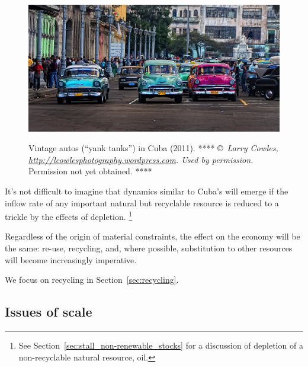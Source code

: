 \begin{figure}[!ht]
\centering\
\includegraphics[width=\linewidth]{Part_0/Chapter_Acct_For_WoN/images/old-cars-of-cuba-dsc_4474-1024.jpg}
\caption[Vintage autos in Cuba]{Vintage autos (``yank tanks'') in Cuba (2011).
**** \copyright~\emph{Larry Cowles, {\scriptsize \emph{\url{http://lcowlesphotography.wordpress.com}}}. Used by permission.} 
Permission not yet obtained. ****}
\label{fig:vintage_autos_cuba}
\end{figure}

It's not difficult to imagine that dynamics similar to Cuba's will emerge
if the inflow rate 
of any important natural but recyclable resource 
is reduced to a trickle
by the effects of depletion.%
	\footnote{
	See Section~\ref{sec:stall_non-renewable_stocks}
	for a discussion of depletion of a non-recyclable natural resource, oil.	
	}

Regardless of the origin of material constraints, 
the effect on the economy will be the same:
re-use, recycling, and, where possible, substitution to other resources
will become increasingly imperative.

We focus on recycling in Section~\ref{sec:recycling}.


\subsection{Issues of scale}
\label{sec:metabolic_scale}

